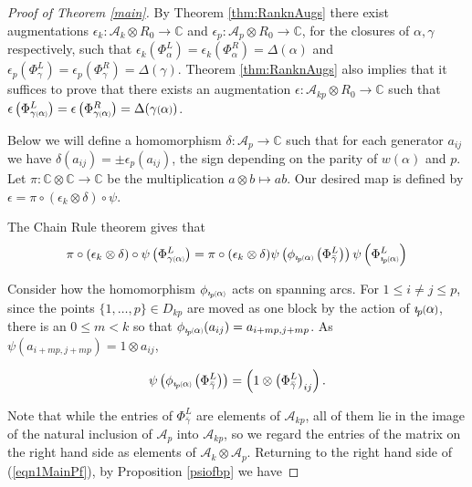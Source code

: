 \documentclass[11pt]{amsart}
\def\C{{\mathbb C}}
\def\A{{\mathcal A}}
\newcommand*{\smallp}[1]{\scalebox{.75}{\ensuremath#1}}
\newcommand*{\subsmallp}[1]{\scalebox{.5}{\ensuremath#1}}
\newcommand{\pp}[2][p]{\imath_{\hspace*{-1pt}#1}\hspace*{-.5pt}\smallp(#2\smallp)}
\newcommand{\subpp}[2][p]{\imath_{\hspace*{-1pt}#1}\hspace*{-.5pt}\subsmallp(#2\subsmallp)}
\theoremstyle{definition}
\begin{document}
\begin{proof}[Proof of Theorem \ref{main}]
By Theorem \ref{thm:RanknAugs} there exist augmentations $\epsilon_k\colon \A_k\otimes R_0 \rightarrow \C$ and $\epsilon_p\colon \A_p\otimes R_0 \rightarrow \C$, for the closures of $\alpha,\gamma$ respectively, such that $\epsilon_k\left(\Phi_\alpha^L\right) = \epsilon_k\left(\Phi_\alpha^R\right) = \Delta(\alpha)$ and $\epsilon_p\left(\Phi_{\gamma}^L\right) = \epsilon_p\left(\Phi_{\gamma}^R\right) = \Delta(\gamma)$. Theorem \ref{thm:RanknAugs} also implies that it suffices to prove that there exists an augmentation $\epsilon\colon \A_{kp}\otimes R_0\rightarrow \C$ such that $\epsilon\left(\Phi_{\gamma\subsmallp(\alpha\subsmallp)}^L\right) = \epsilon\left(\Phi_{\gamma\subsmallp(\alpha\subsmallp)}^R\right) = \Delta(\gamma\smallp(\alpha\smallp))$.


Below we will define a homomorphism $\delta\colon\A_p\rightarrow \C$ such that for each generator $a_{ij}$ we have $\delta(a_{ij}) = \pm \epsilon_p(a_{ij})$, the sign depending on the parity of $w(\alpha)$ and $p$. Let $\pi\colon \C\otimes \C \rightarrow \C$ be the multiplication $a\otimes b\mapsto ab$. Our desired map is defined by $\epsilon = \pi\circ(\epsilon_k\otimes\delta)\circ\psi$.


The Chain Rule theorem gives that
\begin{equation}
\pi\circ(\epsilon_k\otimes\delta)\circ\psi\left(\Phi_{\gamma\subsmallp(\alpha\subsmallp)}^L\right) = \pi\circ(\epsilon_k\otimes\delta)\psi\left(\phi_{\subpp\alpha}\left(\Phi_{\bar\gamma}^L\right)\right)\psi\left(\Phi_{\subpp\alpha}^L\right)
\label{eqn1MainPf}
\end{equation}

Consider how the homomorphism $\phi_{\subpp\alpha}$ acts on spanning arcs. For $1\le i\ne j\le p$, since the points $\{1,\ldots,p\}\in D_{kp}$ are moved as one block by the action of $\pp\alpha$, there is an $0\le m<k$ so that $\phi_{\subpp\alpha}(a_{ij})=a_{i+mp,j+mp}$. As $\psi(a_{i + mp, j+mp})=1\otimes a_{ij}$,

$$\psi\left(\phi_{\subpp\alpha}\left(\Phi_{\bar\gamma}^L\right)\right) = \left(1\otimes \left(\Phi_{\bar\gamma}^L\right)_{ij}\right).$$

Note that while the entries of $\Phi_{\bar\gamma}^L$ are elements of $\A_{kp}$, all of them lie in the image of the natural inclusion of $\A_p$ into $\A_{kp}$, so we regard the entries of the matrix on the right hand side as elements of $\A_k\otimes \A_p$. Returning to the right hand side of (\ref{eqn1MainPf}), by Proposition \ref{psiofbp} we have



\end{proof}
\end{document}
